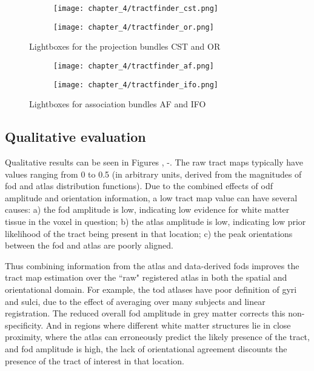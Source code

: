 \begin{figure}[htb!]
  \begin{subfigure}{\textwidth}
    \texttt{[image: chapter\_4/tractfinder\_cst.png]}
    \caption{}
  \end{subfigure}
  \begin{subfigure}{\textwidth}
    \texttt{[image: chapter\_4/tractfinder\_or.png]}
    \caption{}
  \end{subfigure}
  \caption{Lightboxes for the projection bundles CST and OR}
  \label{fig:lbcstor}
\end{figure}
\begin{figure}[htb!]
  \begin{subfigure}{\textwidth}
    \texttt{[image: chapter\_4/tractfinder\_af.png]}
    \caption{}
  \end{subfigure}
  \begin{subfigure}{\textwidth}
    \texttt{[image: chapter\_4/tractfinder\_ifo.png]}
    \caption{}
  \end{subfigure}
  \caption{Lightboxes for association bundles AF and IFO}
  \label{fig:lbcstor}
\end{figure}

\clearpage
\subsection{Qualitative evaluation}

Qualitative results can be seen in Figures , -.
The raw tract maps typically have values ranging from 0 to 0.5 (in arbitrary units, derived from the magnitudes of \gls{fod} and atlas distribution functions).
Due to the combined effects of \gls{odf} amplitude and orientation information, a low tract map value can have several causes: a) the \gls{fod} amplitude is low, indicating low evidence for white matter tissue in the voxel in question; b) the atlas amplitude is low, indicating low prior likelihood of the tract being present in that location; c) the peak orientations between the \gls{fod} and atlas are poorly aligned.

Thus combining information from the atlas and data-derived \gls{fod}s improves the tract map estimation over the ``raw" registered atlas in both the spatial and orientational domain. For example, the \gls{tod} atlases have poor definition of gyri and sulci, due to the effect of averaging over many subjects and linear registration. The reduced overall \gls{fod} amplitude in grey matter corrects this non-specificity. And in regions where different white matter structures lie in close proximity, where the atlas can erroneously predict the likely presence of the tract, and \gls{fod} amplitude is high, the lack of orientational agreement discounts the presence of the tract of interest in that location.

